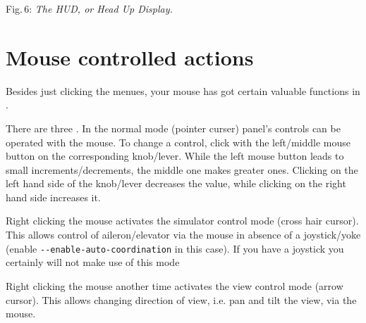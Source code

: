  \centerline{}

\smallskip
 \noindent
Fig.\,6: \textit{The HUD, or Head Up Display.}
\medskip

\section{Mouse controlled actions}

Besides just clicking the menues, your mouse has got certain valuable functions in \FlightGear{}$\!$.


There are three . In the normal mode (pointer curser) panel's controls can be operated with the mouse. To change a control, click with the left/middle mouse button on the corresponding knob/lever. While the left mouse button leads to small increments/decrements, the middle one makes greater ones. Clicking on the left hand side of the knob/lever decreases the value, while clicking on the right hand side increases
it.

 Right clicking the mouse activates the simulator control mode (cross hair cursor). This allows control of aileron/elevator via the mouse in absence of a joystick/yoke (enable \texttt{-$ $-enable-auto-coordination} in this case). If you have a joystick you certainly will not make use of this mode

 Right clicking the mouse another time activates the view control mode (arrow cursor).
 This allows changing direction of view, i.e. pan and tilt the view, via the mouse.

